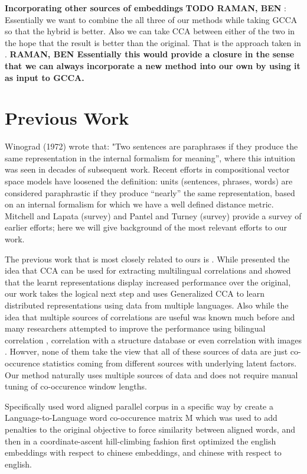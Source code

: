 \documentclass[11pt]{article}
\begin{document}
\textbf{Incorporating other sources of embeddings}
\textbf{TODO RAMAN, BEN} : Essentially we want to combine the all three of our methods
while taking GCCA so that the hybrid is better. Also we can take CCA
between either of the two in the hope that the result is better than
the original. That is the approach taken in
\cite{faruqui2014improving}. \textbf{ RAMAN, BEN Essentially this would provide a closure
in the sense that we can always incorporate a new method into our own by using it as input to GCCA.}

\section{Previous Work}
\label{sec:previouswork}
Winograd (1972) wrote that: "Two sentences are paraphrases if they
produce the same representation in the internal formalism for
meaning”, where this intuition was seen in decades of subsequent work.
Recent efforts in compositional vector space models have loosened the
definition: units (sentences, phrases, words) are considered
paraphrastic if they produce “nearly” the same representation, based
on an internal formalism for which we have a well defined distance
metric.  Mitchell and Lapata (survey) and Pantel and Turney (survey)
provide a survey of earlier efforts; here we will give background of
the most relevant efforts to our work.

The previous work that is most closely related to ours is
\cite{faruqui2014improving}. While
\cite{faruqui2014improving} presented the idea that CCA can be used
for extracting multilingual correlations and showed that the learnt
representations display increased performance over the original, our work takes the logical
next step and uses Generalized CCA to learn distributed
representations using data from multiple languages. Also while the
idea that multiple sources of correlations are useful was known much before and
many researchers attempted to improve the performance using bilingual
correlation \cite{Huang2012Improving,zou2013bilingual}, 
correlation with a structure database \cite{yu2014improving} or even
correlation with images \cite{bruni2012distributional}. Howver, none of them
take the view that all of these sources of data are just co-occurence
statistics coming from different sources with underlying latent
factors. Our method naturally uses multiple sources of data and
does not require manual tuning of co-occurence window lengths. 

Specifically \cite{zou2013bilingual} used word aligned
parallel corpus in a specific way  by create a Language-to-Language word co-occurence
matrix M which was used to add penalties to the original
objective to force similarity between aligned words, and then in a
coordinate-ascent hill-climbing fashion first 
optimized the english embeddings with respect to chinese embeddings,
and chinese with respect to english.
\end{document}
